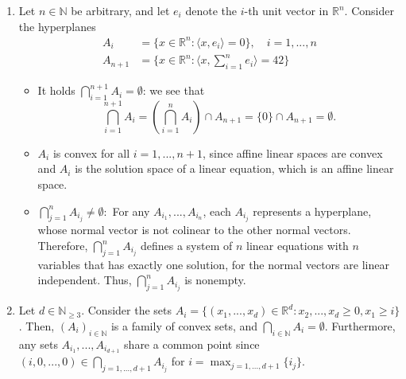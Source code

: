\documentclass[fontsize=11pt, paper=a4]{scrartcl}
\begin{document}

\head{\sheetno}


\begin{enumerate}[label=(\alph*)]
    \item Let $n \in \mathbb N$ be arbitrary, and let $e_i$ denote the $i$-th unit vector in $\mathbb R^n$. Consider the hyperplanes 
    \begin{align*}
        A_i &= \{ x \in \mathbb R^n : \langle x,e_i \rangle = 0 \}, \quad i = 1,...,n \\
        A_{n+1} &= \{ x \in \mathbb R^n: \langle x,\sum_{i=1}^ne_i \rangle = 42 \}
    \end{align*}
    \begin{itemize}
        \item It holds $\bigcap_{i=1}^{n+1} A_i = \emptyset$: we see that $$\bigcap_{i=1}^{n+1} A_i = \left(\bigcap^n_{i=1} A_i\right) \cap A_{n+1} = \{0\} \cap A_{n+1} = \emptyset.$$

        \item $A_i$ is convex for all $i=1,...,n+1$, since affine linear spaces are convex and $A_i$ is the solution space of a linear equation, which is an affine linear space.
        
        \item $\bigcap_{j=1}^n A_{i_j} \neq \emptyset:$ For any $A_{i_1},...,A_{i_n}$, each $A_{i_j}$ represents a hyperplane, whose normal vector is not colinear to the other normal vectors. Therefore, $\bigcap_{j=1}^n A_{i_j}$ defines a system of $n$ linear equations with $n$ variables that has exactly one solution, for the normal vectors are linear independent. Thus, $\bigcap_{j=1}^n A_{i_j}$ is nonempty.
    \end{itemize}
    
    

    \item Let $d \in \mathbb N_{\geq 3}$. Consider the sets $A_i = \{ (x_1,...,x_d) \in \mathbb R^d : x_2,...,x_{d} \geq 0, x_1 \geq i \}$. Then, $(A_i)_{i \in \mathbb N}$ is a family of convex sets, and $\bigcap_{i \in \mathbb N} A_i = \emptyset$. Furthermore, any sets $A_{i_1},...,A_{i_{d+1}}$ share a common point since $(i,0,...,0) \in \bigcap_{j=1,...,d+1} A_{i_j}$ for $i = \max_{j=1,...,d+1}\{i_j \}$.
\end{enumerate}
\end{document}
